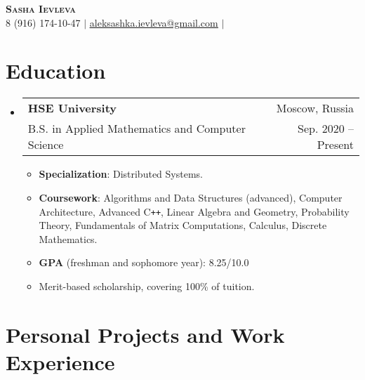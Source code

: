 \documentclass[letterpaper,11pt]{article}
\makeatletter
\newcommand{\resumeItem}[1]{
  \item\small{
    {#1 \vspace{-2pt}}
  }
}
\newcommand{\resumeSubheading}[4]{
   \vspace{-2pt}\item
    \begin{tabular*}{0.97\textwidth}[t]{l@{\extracolsep{\fill}}r}
      \textbf{\small#1} & \small#2 \\
      \textrm{\small#3} & \textrm{\small#4} \\
    \end{tabular*}\vspace{-7pt}
}
\newcommand{\resumeSubHeadingListStart}{\begin{itemize}[leftmargin=0.15in, label={}]}
\newcommand{\resumeSubHeadingListEnd}{\end{itemize}\vspace{-13pt}}
\newcommand{\resumeItemListStart}{\begin{itemize}[leftmargin=0.15in]}
\newcommand{\resumeItemListEnd}{\end{itemize}\vspace{-5pt}}
\makeatother
\begin{document}

\begin{center}
    \Huge \textbf{\scshape Sasha Ievleva} \\ \vspace{1pt}
    \small 8 (916) 174-10-47 $|$ \href{mailto:x@x.com}{\underline{aleksashka.ievleva@gmail.com}} $|$ 
\end{center}


\section{Education}
  \resumeSubHeadingListStart
    \resumeSubheading
      {HSE University}{Moscow, Russia}
      {B.S. in Applied Mathematics and Computer Science}{Sep. 2020 -- Present}
      \resumeItemListStart
        \resumeItem{\textbf{Specialization}: Distributed Systems.}
        \resumeItem{\textbf{Coursework}: Algorithms and Data Structures (advanced), Computer Architecture, Advanced C\texttt{++}, Linear Algebra and Geometry, Probability Theory, Fundamentals of Matrix Computations, Calculus, Discrete Mathematics.}
        \resumeItem{\textbf{GPA} (freshman and sophomore year): 8.25/10.0}
        \resumeItem{Merit-based scholarship, covering 100\% of tuition.}
      \resumeItemListEnd
  \resumeSubHeadingListEnd


\section{Personal Projects and Work Experience}
\end{document}
